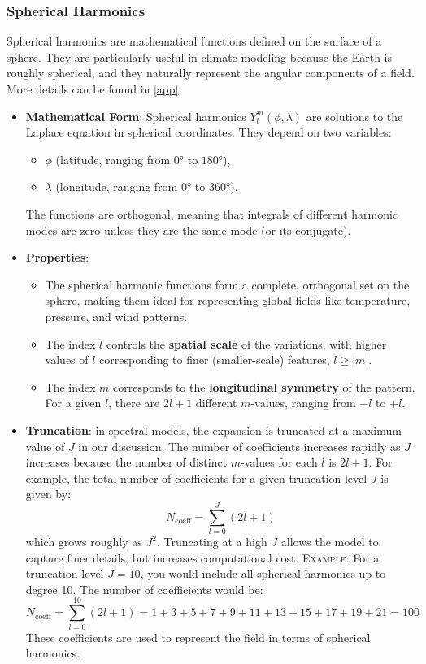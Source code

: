 \subsubsection{Spherical Harmonics}
Spherical harmonics are mathematical functions defined on the surface of a sphere. They are particularly useful in climate modeling because the Earth is roughly spherical, and they naturally represent the angular components of a field. More details can be found in \ref{app}.

\begin{itemize}
    \item \textbf{Mathematical Form}: Spherical harmonics $Y_l^m(\phi,\lambda)$ are solutions to the Laplace equation in spherical coordinates. They depend on two variables:
    \begin{itemize}
        \item $\phi$ (latitude, ranging from $0°$ to $180°$),
        \item $\lambda$ (longitude, ranging from $0°$ to $360°$).
    \end{itemize}The functions are orthogonal, meaning that integrals of different harmonic modes are zero unless they are the same mode (or its conjugate).
    \item \textbf{Properties}:
    \begin{itemize}
        \item The spherical harmonic functions form a complete, orthogonal set on the sphere, making them ideal for representing global fields like temperature, pressure, and wind patterns.
        \item The index $l$ controls the \textbf{spatial scale} of the variations, with higher values of $l$ corresponding to finer (smaller-scale) features, $l\geq|m|$.
        \item The index $m$ corresponds to the \textbf{longitudinal symmetry} of the pattern. For a given $l$, there are $2l+1$ different $m$-values, ranging from $-l$ to $+l$.
    \end{itemize}
    \item \textbf{Truncation}: in spectral models, the expansion is truncated at a maximum value of $J$ in our discussion. The number of coefficients increases rapidly as $J$ increases because the number of distinct $m$-values for each $l$ is $2l+1$. For example, the total number of coefficients for a given truncation level $J$ is given by:
    $$N_{\text{coeff}}=\displaystyle\sum_{l=0}^J(2l+1)$$
    which grows roughly as $J^2$. Truncating at a high $J$ allows the model to capture finer details, but increases computational cost.
    \textsc{Example}: For a truncation level $J=10$, you would include all spherical harmonics up to degree 10. The number of coefficients would be:$$N_{\text{coeff}}=\displaystyle\sum_{l=0}^{10}(2l+1)=1+3+5+7+9+11+13+15+17+19+21=100$$
    These coefficients are used to represent the field in terms of spherical harmonics.
\end{itemize}

